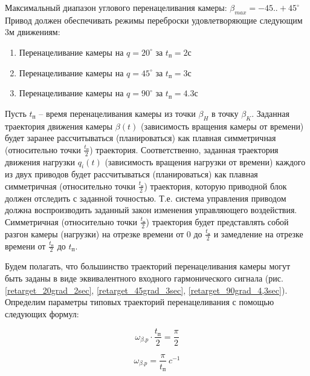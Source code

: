 Максимальный диапазон углового перенацеливания камеры:
$\beta_{max} = -45..+45^{\circ}$
Привод должен обеспечивать режимы переброски удовлетворяющие следующим 3м движениям:

\begin{enumerate}
    \item Перенацеливание камеры на $q = 20^{\circ}$ за $t_{\text{п}} = 2   \text{с}$
    \item Перенацеливание камеры на $q = 45^{\circ}$ за $t_{\text{п}} = 3   \text{с}$
    \item Перенацеливание камеры на $q = 90^{\circ}$ за $t_{\text{п}} = 4.3 \text{с}$
\end{enumerate}

Пусть $t_\text{п}$ – время перенацеливания камеры из точки $\beta_{H}$ в точку $\beta_{K}$.
Заданная траектория движения камеры $\beta(t)$ (зависимость вращения камеры от времени)
будет заранее рассчитываться (планироваться) как плавная симметричная
(относительно точки $\frac{t_\text{п} }{2}$) траектория.
Соответственно, заданная траектория движения нагрузки $q_{i}(t)$
(зависимость вращения нагрузки от времени) каждого из двух приводов будет рассчитываться
(планироваться) как плавная симметричная (относительно точки $\frac{t_\text{п} }{2}$)
траектория, которую приводной блок должен отследить с заданной точностью.
Т.е. система управления приводом должна воспроизводить заданный закон изменения управляющего
воздействия.
Симметричная (относительно точки $\frac{t_\text{п} }{2}$) траектория будет представлять
собой разгон камеры (нагрузки) на отрезке времени от 0 до $\frac{t_\text{п} }{2}$
и замедление на отрезке времени от $\frac{t_\text{п} }{2}$ до $t_\text{п}$.

Будем полагать, что большинство траекторий перенацеливания камеры могут быть заданы
в виде эквивалентного входного гармонического сигнала
(рис. \ref{retarget_20grad_2sec},
      \ref{retarget_45grad_3sec},
      \ref{retarget_90grad_4,3sec}).
Определим параметры типовых траекторий перенацеливания с помощью следующих формул:

\begin{equation}
    \label{retarget_angle}
    \omega_{\beta.p} \cdot \frac{t_\text{п} }{2} = \frac{\pi}{2}
\end{equation}

\begin{equation}
    \label{equiv_signal_frequency}
    \omega_{\beta.p} = \frac{\pi}{t_\text{п} } ~c^{-1}
\end{equation}

